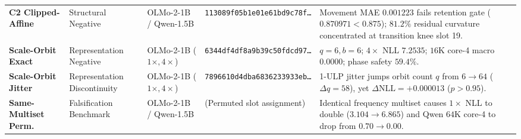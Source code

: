 \begin{table}[t]
{\begin{tabular}{@{}llllp{7.2cm}@{}}
\textbf{C2 Clipped-Affine} & Structural Negative & OLMo-2-1B / Qwen-1.5B & \texttt{113089f05b1e01e61bd9c78f\dots} & Movement MAE $0.001223$ fails retention gate ($0.870971 < 0.875$); $81.2\%$ residual curvature concentrated at transition knee slot 19. \\
\textbf{Scale-Orbit Exact} & Representation Negative & OLMo-2-1B ($1\times, 4\times$) & \texttt{6344df4df8a9b39c50fdcd97\dots} & $q{=}6, b{=}6$; $4\times$ NLL $7.2535$; $16$K core-4 macro $0.0000$; phase safety $59.4\%$. \\
\textbf{Scale-Orbit Jitter} & Representation Discontinuity & OLMo-2-1B ($1\times, 4\times$) & \texttt{7896610d4dba6836233933eb\dots} & 1-ULP jitter jumps orbit count $q$ from $6 \to 64$ ($\Delta q{=}58$), yet $\Delta\text{NLL} = +0.000013$ ($p > 0.95$). \\
\textbf{Same-Multiset Perm.} & Falsification Benchmark & OLMo-2-1B / Qwen-1.5B & (Permuted slot assignment) & Identical frequency multiset causes $1\times$ NLL to double ($3.104 \to 6.865$) and Qwen $64$K core-4 to drop from $0.70 \to 0.00$. \\
\bottomrule
\end{tabular}%
}
\end{table}
